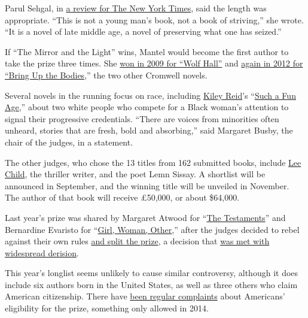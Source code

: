 Parul Sehgal, in
\href{https://www.nytimes.com/2020/03/03/books/review-mirror-light-hilary-mantel.html}{a
review for The New York Times}, said the length was appropriate. ``This
is not a young man's book, not a book of striving,'' she wrote. ``It is
a novel of late middle age, a novel of preserving what one has seized.''

If ``The Mirror and the Light'' wins, Mantel would become the first
author to take the prize three times. She
\href{https://www.nytimes.com/2009/10/07/books/07booker.html}{won in
2009 for ``Wolf Hall''} and
\href{https://artsbeat.blogs.nytimes.com/2012/10/16/hilary-mantel-wins-a-second-booker-prize/}{again
in 2012 for ``Bring Up the Bodies},'' the two other Cromwell novels.

Several novels in the running focus on race, including
\href{https://www.nytimes.com/2020/01/09/books/review/inside-the-list-kiley-reid.html}{Kiley
Reid}'s
``\href{https://www.nytimes.com/2019/12/31/books/review/such-a-fun-age-kiley-reid.html}{Such
a Fun Age},'' about two white people who compete for a Black woman's
attention to signal their progressive credentials. ``There are voices
from minorities often unheard, stories that are fresh, bold and
absorbing,'' said Margaret Busby, the chair of the judges, in a
statement.

The other judges, who chose the 13 titles from 162 submitted books,
include
\href{https://www.nytimes.com/2019/10/23/books/jack-reacher-lee-child-wyoming.html}{Lee
Child}, the thriller writer, and the poet Lemn Sissay. A shortlist will
be announced in September, and the winning title will be unveiled in
November. The author of that book will receive £50,000, or about
\$64,000.

Last year's prize was shared by Margaret Atwood for
``\href{https://www.nytimes.com/2019/09/03/books/review/testaments-margaret-atwood-handmaids-tale.html}{The
Testaments}'' and Bernardine Evaristo for
``\href{https://www.nytimes.com/2019/11/04/books/review-girl-woman-other-bernardine-evaristo.html}{Girl,
Woman, Other},'' after the judges decided to rebel against their own
rules
\href{https://www.nytimes.com/2019/10/14/books/booker-prize-winner-atwood-evaristo.html}{and
split the prize}, a decision that
\href{https://www.theguardian.com/books/2019/oct/15/bernardine-evaristo-margaret-atwood-share-booker-prize-award}{was
met with widespread derision}.

This year's longlist seems unlikely to cause similar controversy,
although it does include six authors born in the United States, as well
as three others who claim American citizenship. There have
\href{https://www.nytimes.com/2019/07/23/books/booker-longlist-margaret-atwood.html}{been
regular complaints} about Americans' eligibility for the prize,
something only allowed in 2014.


